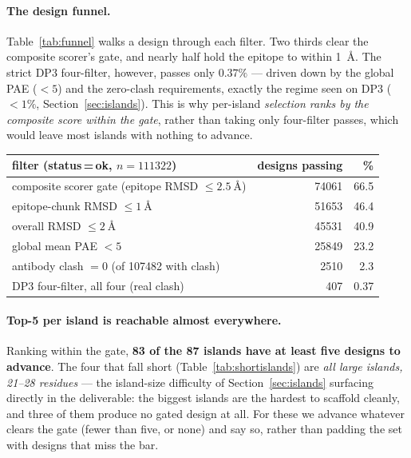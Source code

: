 \paragraph{The design funnel.}
Table~\ref{tab:funnel} walks a design through each filter. Two thirds clear the composite
scorer's gate, and nearly half hold the epitope to within \SI{1}{\angstrom}. The strict DP3
four-filter, however, passes only $0.37\%$ --- driven down by the global PAE ($<5$) and the
zero-clash requirements, exactly the regime seen on DP3 ($<1\%$, Section~\ref{sec:islands}).
This is why per-island \emph{selection ranks by the composite score within the gate}, rather
than taking only four-filter passes, which would leave most islands with nothing to advance.

\begin{center}
\begin{tabular}{lrr}
\toprule
filter (status\,=\,ok, $n=\num{111322}$) & designs passing & \% \\
\midrule
composite scorer gate (epitope RMSD $\le \SI{2.5}{\angstrom}$) & \num{74061} & 66.5 \\
\quad epitope-chunk RMSD $\le \SI{1}{\angstrom}$              & \num{51653} & 46.4 \\
\quad overall RMSD $\le \SI{2}{\angstrom}$                    & \num{45531} & 40.9 \\
\quad global mean PAE $< 5$                                   & \num{25849} & 23.2 \\
\quad antibody clash $= 0$ (of \num{107482} with clash)      & \num{2510}  & 2.3 \\
\midrule
DP3 four-filter, all four (real clash) & \num{407} & 0.37 \\
\bottomrule
\end{tabular}
\label{tab:funnel}
\end{center}

\paragraph{Top-5 per island is reachable almost everywhere.}
Ranking within the gate, \textbf{83 of the 87 islands have at least five designs to advance}.
The four that fall short (Table~\ref{tab:shortislands}) are \emph{all large islands, 21--28
residues} --- the island-size difficulty of Section~\ref{sec:islands} surfacing directly in
the deliverable: the biggest islands are the hardest to scaffold cleanly, and three of them
produce no gated design at all. For these we advance whatever clears the gate (fewer than
five, or none) and say so, rather than padding the set with designs that miss the bar.

